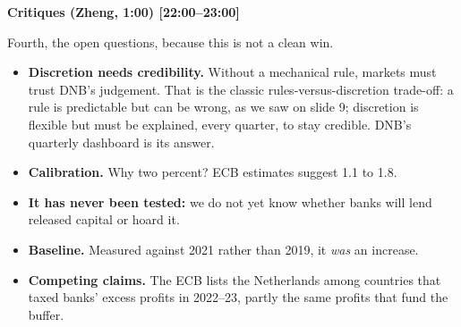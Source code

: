 {\small\textbf{Critiques (Zheng, 1:00) [22:00–23:00]}}\par\smallskip
Fourth, the open questions, because this is not a clean win.
\begin{itemize}\setlength\itemsep{0pt}
\item \textbf{Discretion needs credibility.} Without a mechanical rule, markets must trust DNB's judgement. That is the classic rules-versus-discretion trade-off: a rule is predictable but can be wrong, as we saw on slide 9; discretion is flexible but must be explained, every quarter, to stay credible. DNB's quarterly dashboard is its answer.
\item \textbf{Calibration.} Why two percent? ECB estimates suggest 1.1 to 1.8.
\item \textbf{It has never been tested:} we do not yet know whether banks will lend released capital or hoard it.
\item \textbf{Baseline.} Measured against 2021 rather than 2019, it \emph{was} an increase.
\item \textbf{Competing claims.} The ECB lists the Netherlands among countries that taxed banks' excess profits in 2022–23, partly the same profits that fund the buffer.
\end{itemize}
